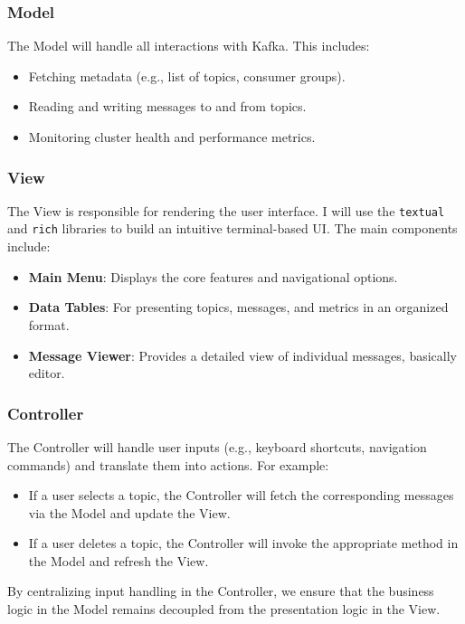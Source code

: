\documentclass[10pt , a4paper]{report}
\begin{document}
\subsubsection{Model}

The Model will handle all interactions with Kafka. This includes:
\begin{itemize}
    \item Fetching metadata (e.g., list of topics, consumer groups).
    \item Reading and writing messages to and from topics.
    \item Monitoring cluster health and performance metrics.
\end{itemize}

\subsubsection{View}

The View is responsible for rendering the user interface. I will use the \texttt{textual} and \texttt{rich} libraries to build an intuitive terminal-based UI. The main components include:
\begin{itemize}
    \item \textbf{Main Menu}: Displays the core features and navigational options.
    \item \textbf{Data Tables}: For presenting topics, messages, and metrics in an organized format.
    \item \textbf{Message Viewer}: Provides a detailed view of individual messages, basically editor.
\end{itemize}

\subsubsection{Controller}

The Controller will handle user inputs (e.g., keyboard shortcuts, navigation commands) and translate them into actions. For example:
\begin{itemize}
    \item If a user selects a topic, the Controller will fetch the corresponding messages via the Model and update the View.
    \item If a user deletes a topic, the Controller will invoke the appropriate method in the Model and refresh the View.
\end{itemize}

By centralizing input handling in the Controller, we ensure that the business logic in the Model remains decoupled from the presentation logic in the View.
\end{document}
